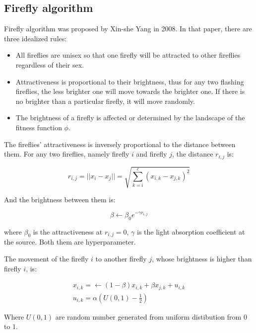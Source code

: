 \documentclass[conference]{IEEEtran}
\begin{document}
\subsection{Firefly algorithm}
Firefly algorithm was proposed by Xin-she Yang \cite{b4} in 2008. In that paper, there are three idealized rules:
\begin{itemize}
    \item All fireflies are unisex so that one firefly will be attracted to other fireflies regardless of their sex.
    \item Attractiveness is proportional to their brightness, thus for any two flashing fireflies, the less brighter one will move towards the brighter one. If there is no brighter than a particular firefly, it will move randomly.
    \item The brightness of a firefly is affected or determined by the landscape of the fitness function $\phi$.
\end{itemize}

The fireflies' attractiveness is inversely proportional to the distance between them. For any two fireflies, namely firefly $i$ and firefly $j$, the distance $r_{i,j}$ is:

\begin{equation}
    \label{distance}
    r_{i,j}=||x_i-x_j||=\sqrt{\sum\limits_{k=i}^{c}(x_{i,k}-x_{j,k})^2}
\end{equation}

And the brightness between them is:

\begin{equation}
    \label{brightness}
    \beta\leftarrow\beta_0 e^{-\gamma r_{i,j}}
\end{equation}

where $\beta_0$ is the attractiveness at $r_{i,j}=0$, $\gamma$ is the light absorption coefficient at the source. Both them are hyperparameter. 

The movement of the firefly $i$ to another firefly $j$, whose brightness is higher than firefly $i$, is:

\begin{equation}
\begin{aligned}
    \label{movement}
    x_{i,k}=\leftarrow (1-\beta)x_{i,k}+\beta x_{j,k}+u_{i,k}\\
    u_{i,k}=\alpha(U(0,1)-\frac{1}{2})
\end{aligned}
\end{equation}

Where $U(0,1)$ are random number generated from uniform distibution from $0$ to $1$.
\end{document}
